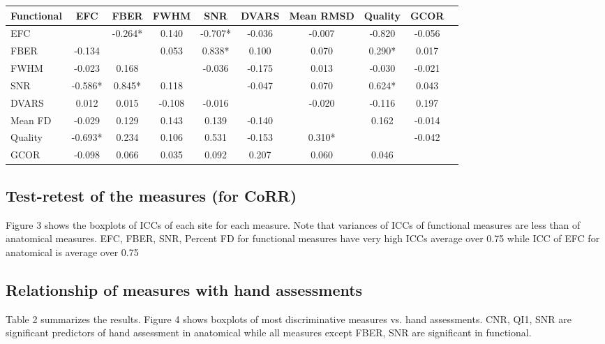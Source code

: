 \documentclass{frontiersSCNS} %
\begin{document}
\begin{table}[h]
  \begin{center}
    \begin{tabular}{ l c c c c c c c c p{1.5cm}}
    \hline
    Functional & EFC & FBER & FWHM & SNR & DVARS & Mean RMSD & Quality & GCOR  \\ \hline
    EFC & & -0.264* & 0.140 & -0.707* & -0.036 & -0.007 & -0.820 & -0.056 \\
    FBER & -0.134 & & 0.053 & 0.838* & 0.100 & 0.070 & 0.290* & 0.017 \\
    FWHM & -0.023 & 0.168 & & -0.036 & -0.175 & 0.013 & -0.030 & -0.021 \\
    SNR & -0.586* & 0.845* & 0.118 & & -0.047 & 0.070 & 0.624* & 0.043 \\
    DVARS & 0.012 & 0.015 & -0.108 & -0.016 & & -0.020 & -0.116 & 0.197 \\
    Mean FD & -0.029 & 0.129 & 0.143 & 0.139 & -0.140 & & 0.162 & -0.014 \\
    Quality & -0.693* & 0.234 & 0.106 & 0.531 & -0.153 & 0.310* & & -0.042 \\
    GCOR & -0.098 & 0.066 & 0.035 & 0.092 & 0.207 & 0.060 & 0.046 & \\ 
    \hline
    \end{tabular}
  \end{center}
\end{table}

\subsection{Test-retest of the measures (for CoRR)}
Figure 3 shows the boxplots of ICCs of each site for each measure. Note that variances of ICCs of functional measures are less than of anatomical measures. EFC, FBER, SNR, Percent FD for functional measures have very high ICCs average over 0.75 while ICC of EFC for anatomical is average over 0.75

\subsection{Relationship of measures with hand assessments}
Table 2 summarizes the results. Figure 4 shows boxplots of most discriminative measures vs. hand assessments. CNR, QI1, SNR are significant predictors of hand assessment in anatomical while all measures except FBER, SNR are significant in functional.
\end{document}
